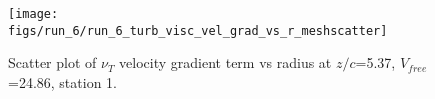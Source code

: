\begin{figure}[H]
\centering
\texttt{[image: figs/run\_6/run\_6\_turb\_visc\_vel\_grad\_vs\_r\_meshscatter]}
\caption{Scatter plot of $\nu_T$ velocity gradient term vs radius at $z/c$=5.37, $V_{free}$=24.86, station 1.}
\label{fig:run_6_turb_visc_vel_grad_vs_r_meshscatter}
\end{figure}


